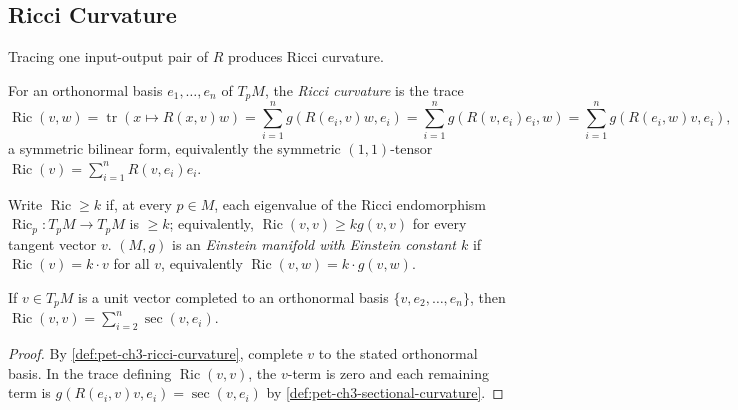 \subsection{Ricci Curvature}

Tracing one input-output pair of $R$ produces Ricci curvature.

\begin{definition}
  \label{def:pet-ch3-ricci-curvature}


  For an orthonormal basis $e_1,\dots,e_n$ of $T_pM$, the \emph{Ricci curvature} is
  the trace
  \[
    \operatorname{Ric}(v,w)=\operatorname{tr}(x\mapsto R(x,v)w)
    =\sum_{i=1}^ng(R(e_i,v)w,e_i)=\sum_{i=1}^ng(R(v,e_i)e_i,w)
    =\sum_{i=1}^ng(R(e_i,w)v,e_i),
  \]
  a symmetric bilinear form, equivalently the symmetric $(1,1)$-tensor
  $\operatorname{Ric}(v)=\sum_{i=1}^nR(v,e_i)e_i$.
\end{definition}

\begin{definition}
  \label{def:pet-ch3-einstein-manifold}


  Write $\operatorname{Ric}\ge k$ if, at every $p\in M$, each eigenvalue of the
  Ricci endomorphism $\operatorname{Ric}_p:T_pM\to T_pM$ is $\ge k$; equivalently,
  $\operatorname{Ric}(v,v)\ge kg(v,v)$ for every tangent vector $v$. $(M,g)$ is an
  \emph{Einstein manifold with Einstein constant $k$} if $\operatorname{Ric}(v)=k\cdot v$
  for all $v$, equivalently $\operatorname{Ric}(v,w)=k\cdot g(v,w)$.
\end{definition}

\begin{proposition}
  \label{prop:pet-ch3-ricci-sectional-relation}


  If $v\in T_pM$ is a unit vector completed to an orthonormal basis
  $\{v,e_2,\dots,e_n\}$, then
  $\operatorname{Ric}(v,v)=\sum_{i=2}^n\sec(v,e_i)$.
\end{proposition}
\begin{proof}

  \sketch
  By \cref{def:pet-ch3-ricci-curvature}, complete $v$ to the stated orthonormal
  basis. In the trace defining
  $\operatorname{Ric}(v,v)$, the $v$-term is zero and each remaining term is
  $g(R(e_i,v)v,e_i)=\sec(v,e_i)$ by
  \cref{def:pet-ch3-sectional-curvature}.
\end{proof}

